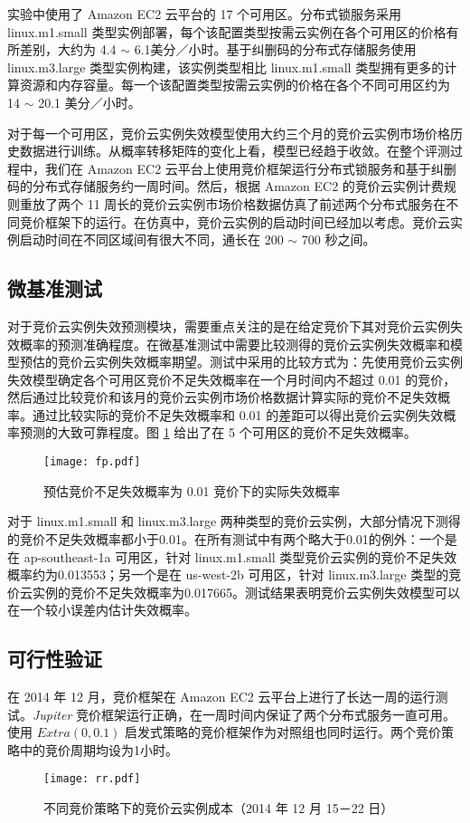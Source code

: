 实验中使用了 Amazon EC2 云平台的 17 个可用区。分布式锁服务采用 linux.m1.small 类型实例部署，每个该配置类型按需云实例在各个可用区的价格有所差别，大约为 4.4 $\sim$ 6.1美分／小时。基于纠删码的分布式存储服务使用 linux.m3.large 类型实例构建，该实例类型相比 linux.m1.small 类型拥有更多的计算资源和内存容量。每一个该配置类型按需云实例的价格在各个不同可用区约为 14 $\sim$ 20.1 美分／小时。

对于每一个可用区，竞价云实例失效模型使用大约三个月的竞价云实例市场价格历史数据进行训练。从概率转移矩阵的变化上看，模型已经趋于收敛。在整个评测过程中，我们在 Amazon EC2 云平台上使用竞价框架运行分布式锁服务和基于纠删码的分布式存储服务约一周时间。然后，根据 Amazon EC2 的竞价云实例计费规则重放了两个 11 周长的竞价云实例市场价格数据仿真了前述两个分布式服务在不同竞价框架下的运行。在仿真中，竞价云实例的启动时间已经加以考虑。竞价云实例启动时间在不同区域间有很大不同，通长在 200 $\sim$ 700 秒之间\cite{Mao:2012:PSV:2353730.2353859}。

\subsection{微基准测试}
对于竞价云实例失效预测模块，需要重点关注的是在给定竞价下其对竞价云实例失效概率的预测准确程度。在微基准测试中需要比较测得的竞价云实例失效概率和模型预估的竞价云实例失效概率期望。测试中采用的比较方式为：先使用竞价云实例失效模型确定各个可用区竞价不足失效概率在一个月时间内不超过 0.01 的竞价，然后通过比较竞价和该月的竞价云实例市场价格数据计算实际的竞价不足失效概率。通过比较实际的竞价不足失效概率和 0.01 的差距可以得出竞价云实例失效概率预测的大致可靠程度。图 \ref{figure:fp} 给出了在 5 个可用区的竞价不足失效概率。
\begin{figure}
  \centering
  \texttt{[image: fp.pdf]}
  \caption{预估竞价不足失效概率为 0.01 竞价下的实际失效概率}
  \label{figure:fp}
\end{figure}

对于 linux.m1.small 和 linux.m3.large 两种类型的竞价云实例，大部分情况下测得的竞价不足失效概率都小于0.01。在所有测试中有两个略大于0.01的例外：一个是在 ap-southeast-1a 可用区，针对 linux.m1.small 类型竞价云实例的竞价不足失效概率约为0.013553；另一个是在 us-west-2b 可用区，针对 linux.m3.large 类型的竞价云实例的竞价不足失效概率为0.017665。测试结果表明竞价云实例失效模型可以在一个较小误差内估计失效概率。

\subsection{可行性验证}
在 2014 年 12 月，竞价框架在 Amazon EC2 云平台上进行了长达一周的运行测试。\emph{Jupiter} 竞价框架运行正确，在一周时间内保证了两个分布式服务一直可用。使用 $Extra(0, 0.1)$ 启发式策略的竞价框架作为对照组也同时运行。两个竞价策略中的竞价周期均设为1小时。
\begin{figure}
  \centering
  \texttt{[image: rr.pdf]}
  \caption{不同竞价策略下的竞价云实例成本（2014 年 12 月 15－22 日）}
  \label{figure:rr}
\end{figure}

